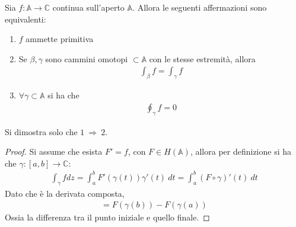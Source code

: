\documentclass[a4paper, oneside]{article}
\begin{document}
\begin{theorem}
    Sia $f : \mathbb{A} \to \mathbb{C}$ continua sull'aperto $\mathbb{A}$. Allora
    le seguenti affermazioni sono equivalenti:
    \begin{enumerate}
        \item $f$ ammette primitiva
        \item Se $\beta, \gamma$ sono cammini omotopi $ \subset \mathbb{A}$ 
        con le stesse estremità, allora 
        \begin{align}
            \int_{\beta}f = \int_{\gamma}^{} f  
        \end{align}
        \item $\forall \gamma \subset  \mathbb{A}$ si ha che 
        \begin{align}
            \oint_\gamma f = 0 
        \end{align}
    \end{enumerate}
    Si dimostra solo che $1 \ \Longrightarrow \ 2$.
\end{theorem}
\begin{proof}
    Si assume che esista $F' = f$, con $F \in H(\mathbb{A})$, allora
    per definizione si ha che $\gamma : [a, b] \to \mathbb{C}$:
    \begin{gather*}
        \int_{\gamma}^{} f dz = \int_{a}^{b}  F'(\gamma(t))\gamma'(t) \ dt = \int_{a}^{b} (F \circ \gamma)' (t) \ dt  
    \end{gather*}
    Dato che è la derivata composta, 
    \begin{gather*}
        = F(\gamma(b)) - F(\gamma(a))
    \end{gather*}
    Ossia la differenza tra il punto iniziale e quello finale. 
\end{proof}
\end{document}
